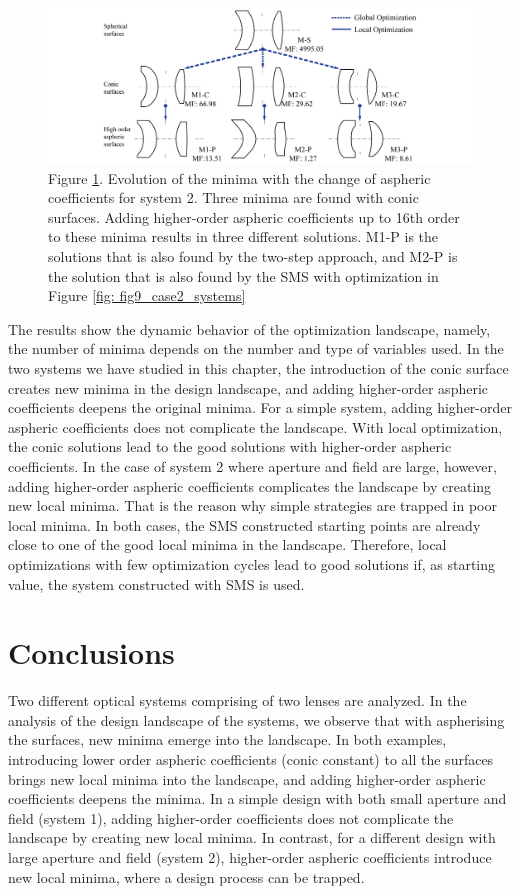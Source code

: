 \begin{figure}[h!]
    \centering
    \includegraphics[width=1\textwidth]{chapter-5/figures/Fig13_OE340147.png}
    \caption{Figure \ref{fig: fig13_case2_optStruc}. Evolution of the minima with the change of aspheric coefficients for system 2. Three minima are found with conic surfaces. Adding higher-order aspheric coefficients up to 16th order to these minima results in three different solutions. M1-P is the solutions that is also found by the two-step approach, and M2-P is the solution that is also found by the SMS with optimization in Figure \ref{fig: fig9_case2_systems}}
    \label{fig: fig13_case2_optStruc}
\end{figure}

The results show the dynamic behavior of the optimization landscape, namely, the number of minima depends on the number and type of variables used. In the two systems we have studied in this chapter, the introduction of the conic surface creates new minima in the design landscape, and adding higher-order aspheric coefficients deepens the original minima. For a simple system, adding higher-order aspheric coefficients does not complicate the landscape. With local optimization, the conic solutions lead to the good solutions with higher-order aspheric coefficients. In the case of system 2 where aperture and field are large, however, adding higher-order aspheric coefficients complicates the landscape by creating new local minima. That is the reason why simple strategies are trapped in poor local minima. In both cases, the SMS constructed starting points are already close to one of the good local minima in the landscape. Therefore, local optimizations with few optimization cycles lead to good solutions if, as starting value, the system constructed with SMS is used.

\section{Conclusions}

Two different optical systems comprising of two lenses are analyzed. In the analysis of the design landscape of the systems, we observe that with aspherising the surfaces, new minima emerge into the landscape. In both examples, introducing lower order aspheric coefficients (conic constant) to all the surfaces brings new local minima into the landscape, and adding higher-order aspheric coefficients deepens the minima. In a simple design with both small aperture and field (system 1), adding higher-order coefficients does not complicate the landscape by creating new local minima. In contrast, for a different design with large aperture and field (system 2), higher-order aspheric coefficients introduce new local minima, where a design process can be trapped.


